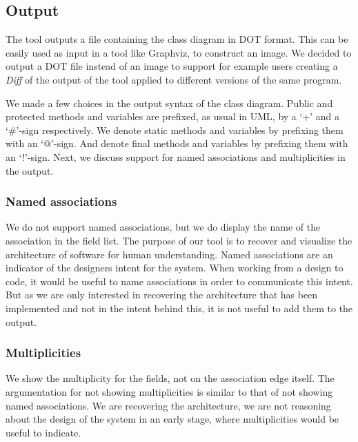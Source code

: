 \subsection{Output}
	The tool outputs a file containing the class diagram in DOT format. 
	This can be easily used as input in a tool like Graphviz, to construct an image.
	We decided to output a DOT file instead of an image to support for example users creating a \textit{Diff} of the output of the tool 	applied to different versions of the same program.
	
	We made a few choices in the output syntax of the class diagram. 
	Public and protected methods and variables are prefixed, as usual in UML, by a `+' and a `\#'-sign respectively.
	We denote static methods and variables by prefixing them with an `@'-sign.
	And denote final methods and variables by prefixing them with an `!'-sign.	
	Next, we discuss support for named associations and multiplicities in the output.

	\subsubsection{Named associations}
		We do not support named associations, but we do display the name of the association in the field list. 
		The purpose of our tool is to recover and visualize the architecture of software for human understanding.
		Named associations are an indicator of the designers intent for the system.
		When working from a design to code, it would be useful to name associations in order to communicate this intent.
		But as we are only interested in recovering the architecture that has been implemented and not in the intent behind this,
		it is not useful to add them to the output.
		
	\subsubsection{Multiplicities}
		We show the multiplicity for the fields, not on the association edge itself. 
		The argumentation for not showing multiplicities is similar to that of not showing named associations.
		We are recovering the architecture, we are not reasoning about the design of the system in an early stage, 
		where multiplicities would be useful to indicate.
